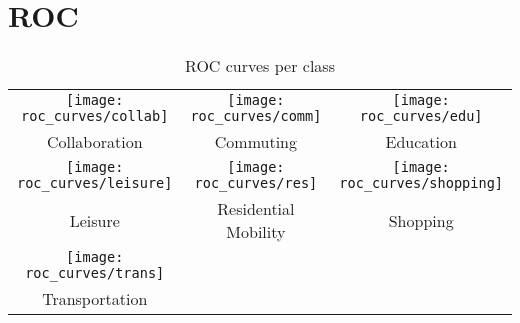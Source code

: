 \chapter{ROC}\label{app:ROC-curves}
    \begin{table}
        \centering
        \begin{tabular}{ccc}

\texttt{[image: roc\_curves/collab]}& \texttt{[image: roc\_curves/comm]} & \texttt{[image: roc\_curves/edu]} \\
Collaboration & Commuting & Education \\
             \texttt{[image: roc\_curves/leisure]} & \texttt{[image: roc\_curves/res]} & \texttt{[image: roc\_curves/shopping]} \\
             Leisure & Residential Mobility & Shopping \\
             \texttt{[image: roc\_curves/trans]} & & \\
             Transportation & & \\
        \end{tabular}
        \caption{ROC curves per class}
        \label{tbl:table_of_figures}
    \end{table}
